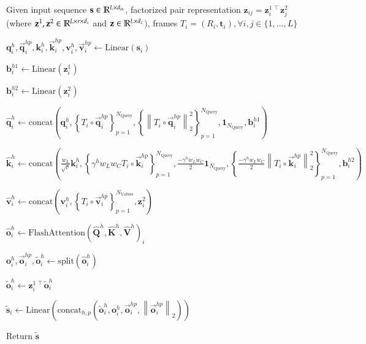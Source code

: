 \begin{algorithm}[H]
\caption{FlashIPA with factorized pair representations}
\label{alg:ipa-flash}
Given input sequence $\mathbf{s}\in \mathbb{R}^{L\times d_{in}}$, factorized pair representation $\mathbf{z}_{ij}=\mathbf{z}_i^{1\,\intercal}\mathbf{z}_j^2$ (where $\mathbf{z}^1, \mathbf{z}^2 \in \mathbb{R}^{L\times r\times d_z}$ and $\mathbf{z} \in \mathbb{R}^{L\times d_z}$), frames $T_i=\left(R_i,\mathbf{t}_i\right), \forall i,j\in\{1,...,L\}$

\begin{algorithmic}[1]

\State $\mathbf{q}_i^h, \vec{\mathbf{q}}_i^{hp}, \mathbf{k}_i^h, \vec{\mathbf{k}}_i^{hp}, \mathbf{v}_i^h, \vec{\mathbf{v}}_i^{hp} \leftarrow \textrm{Linear}\left(\mathbf{s}_i\right)$

\State $\mathbf{b}_i^{h1} \leftarrow \textrm{Linear}\left(\mathbf{z}_i^1\right)$

\State $\mathbf{b}_i^{h2} \leftarrow \textrm{Linear}\left(\mathbf{z}_i^2\right)$

\State $\hat{\mathbf{q}}_i^h \gets \text{concat} \left( \mathbf{q}_i^h, \left\{ T_i \circ \vec{\mathbf{q}}_i^{hp} \right\}_{p=1}^{N_{\text{Query}}}, \left\{ \left\| T_i \circ \vec{\mathbf{q}}_i^{hp} \right\|_2^2 \right\}_{p=1}^{N_{\text{Query}}}, \mathbf{1}_{N_{\text{Query}}}, \mathbf{b}_i^{h1} \right)$

\State $\hat{\mathbf{k}}_i^h \gets \text{concat} \left( 
    \frac{w_L}{\sqrt{c}} \mathbf{k}_i^h, 
    \left\{ \gamma^h w_L w_C T_i \circ \vec{\mathbf{k}}_i^{hp} \right\}_{p=1}^{N_{\text{Query}}},
    \frac{-\gamma^h w_L w_C}{2} \mathbf{1}_{N_{\text{Query}}}, 
    \left\{ \frac{-\gamma^h w_L w_C}{2} \left\| T_i \circ \vec{\mathbf{k}}_i^{hp} \right\|_2^2 \right\}_{p=1}^{N_{\text{Query}}},
    \mathbf{b}_i^{h2} 
\right)$

\State $\hat{\mathbf{v}}_i^h \gets \text{concat} \left( \mathbf{v}_i^h, \left\{ T_i \circ \vec{\mathbf{v}}_i^{hp} \right\}_{p=1}^{N_{\text{Values}}}, \mathbf{z}_i^2 \right)$

\State $\hat{\mathbf{o}}_i^h \gets \text{FlashAttention}(\hat{\mathbf{Q}}^h, \hat{\mathbf{K}}^h, \hat{\mathbf{V}}^h)_i$

\State $\mathbf{o}_i^h, \vec{\mathbf{o}}_i^{hp}, \tilde{\mathbf{o}}_i^h \gets \text{split}(\hat{\mathbf{o}}_i^h)$

\State $\tilde{\mathbf{o}}_i^{h} \leftarrow \mathbf{z}_i^{1\,\intercal}\tilde{\mathbf{o}}_i^{h}$

\State $\mathbf{\tilde{s}}_i \gets \text{Linear}\left( \text{concat}_{h,p} \left( \tilde{\mathbf{o}}_i^h, \mathbf{o}_i^h, \vec{\mathbf{o}}_i^{hp}, \left\| \vec{\mathbf{o}}_i^{hp} \right\|_2 \right) \right)$

\State Return $\mathbf{\tilde{s}}$
\end{algorithmic}
\end{algorithm}

